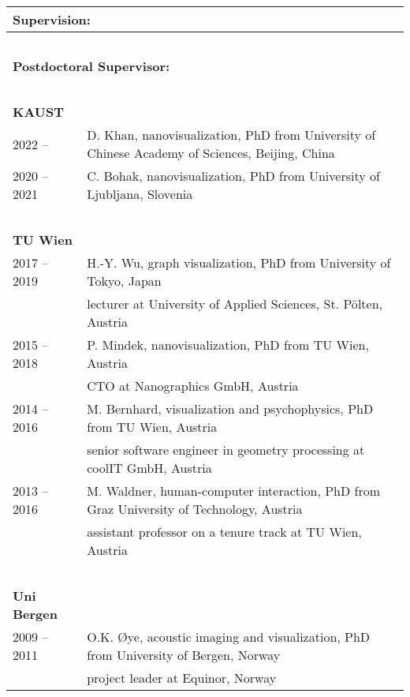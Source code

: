 \documentclass[a4paper,11pt]{letter}
\begin{document}
\begin{tabular}{l| l}
\multicolumn{2}{l}{\large{\textbf{Supervision:}}} \\
\hline
\multicolumn{2}{l}{\textbf{~}} \\
\multicolumn{2}{l}{\textbf{Postdoctoral Supervisor:}} \\
\multicolumn{2}{l}{\textbf{~}} \\
\textbf{KAUST} & \\
2022 -- & D. Khan, nanovisualization, PhD from University of
Chinese Academy of Sciences, Beijing, China \\
2020 -- 2021 & C. Bohak, nanovisualization, PhD from University of Ljubljana, Slovenia \\
\hline
\multicolumn{2}{l}{\textbf{~}} \\
\textbf{TU Wien} & \\
2017 -- 2019 & H.-Y. Wu, graph visualization, PhD from University of Tokyo, Japan \\
 & lecturer at University of Applied Sciences, St. P{\"o}lten, Austria \\
2015 -- 2018 & P. Mindek, nanovisualization, PhD from TU Wien, Austria \\
 & CTO at Nanographics GmbH, Austria \\
2014 -- 2016 & M. Bernhard, visualization and psychophysics, PhD from TU Wien, Austria \\
 & senior software engineer in geometry processing at coolIT GmbH, Austria \\
2013 -- 2016 & M. Waldner, human-computer interaction, PhD from Graz University of Technology, Austria \\
 & assistant professor on a tenure track at TU Wien, Austria \\
\hline
\multicolumn{2}{l}{\textbf{~}} \\
\textbf{Uni Bergen} & \\
2009 -- 2011 & O.K. \O{}ye, acoustic imaging and visualization, PhD from University of Bergen, Norway  \\
 & project leader  at Equinor, Norway \\
\end{tabular}

~\\
\end{document}
